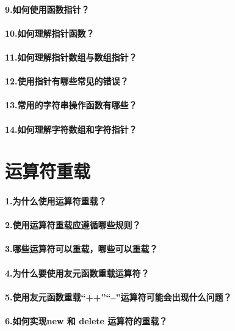 \documentclass[UTF8,a4paper,8pt]{ctexart}
\begin{document}
	 \paragraph{9.如何使用函数指针？}  
	 \paragraph{10.如何理解指针函数？}
	 \paragraph{11.如何理解指针数组与数组指针？}
	 \paragraph{12.使用指针有哪些常见的错误？}
	 \paragraph{13.常用的字符串操作函数有哪些？}
	 \paragraph{14.如何理解字符数组和字符指针？}
 
\section*{运算符重载}
 	 \paragraph{1.为什么使用运算符重载？} 
 	 \paragraph{2.使用运算符重载应遵循哪些规则？}
 	 \paragraph{3.哪些运算符可以重载，哪些可以重载？}
 	 \paragraph{4.为什么要使用友元函数重载运算符？}
 	 \paragraph{5.使用友元函数重载“++”“--”运算符可能会出现什么问题？}
 	 \paragraph{6.如何实现new 和 delete 运算符的重载？}
\end{document}
